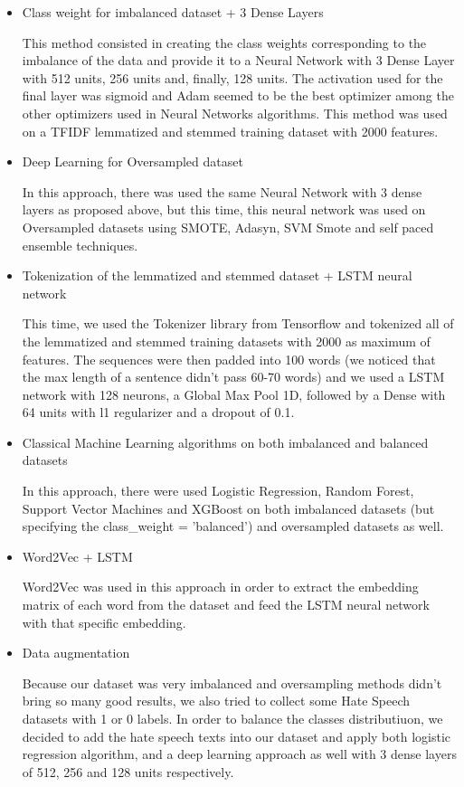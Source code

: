 \documentclass[11pt]{article}
\begin{document}
\begin{itemize}
\item Class weight for imbalanced dataset + 3 Dense Layers

This method consisted in creating the class weights corresponding to the
imbalance of the data and provide it to a Neural Network with 3 Dense Layer
with 512 units, 256 units and, finally, 128 units. The activation used for
the final layer was sigmoid and Adam seemed to be the best optimizer among
the other optimizers used in Neural Networks algorithms. This method was
used on a TFIDF lemmatized and stemmed training dataset with 2000 features.

\item Deep Learning for Oversampled dataset

In this approach, there was used the same Neural Network with 3 dense layers
as proposed above, but this time, this neural network was used on
Oversampled datasets using SMOTE, Adasyn, SVM Smote and self paced ensemble
techniques.

\item Tokenization of the lemmatized and stemmed dataset + LSTM neural
network

This time, we used the Tokenizer library from Tensorflow and tokenized all
of the lemmatized and stemmed training datasets with 2000 as maximum of
features. The sequences were then padded into 100 words (we noticed that the
max length of a sentence didn't pass 60-70 words) and we used a LSTM network
with 128 neurons, a Global Max Pool 1D, followed by a Dense with 64 units
with l1 regularizer and a dropout of 0.1. 

\item Classical Machine Learning algorithms on both imbalanced and balanced
datasets

In this approach, there were used Logistic Regression, Random Forest,
Support Vector Machines and XGBoost on both imbalanced datasets (but
specifying the class\_weight = 'balanced') and oversampled datasets as well. 

\item Word2Vec + LSTM

Word2Vec was used in this approach in order to extract the embedding matrix
of each word from the dataset and feed the LSTM neural network with that
specific embedding.

\item Data augmentation

Because our dataset was very imbalanced and oversampling methods didn't
bring so many good results, we also tried to collect some Hate Speech
datasets with 1 or 0 labels. In order to balance the classes distributiuon,
we decided to add the hate speech texts into our dataset and apply both
logistic regression algorithm, and a deep learning approach as well with 3
dense layers of 512, 256 and 128 units respectively.


\end{itemize}
\end{document}
